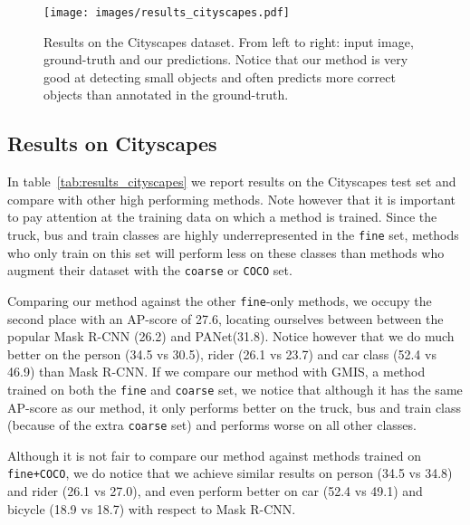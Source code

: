 \begin{figure*}
    \begin{center}
    	\texttt{[image: images/results\_cityscapes.pdf]}
    \end{center}
    \caption{Results on the Cityscapes dataset. From left to right: input image, ground-truth and our predictions. Notice that our method is very good at detecting small objects and often predicts more correct objects than annotated in the ground-truth.}
    \label{fig:results}
\end{figure*}

\subsection{Results on Cityscapes}
In table~\ref{tab:results_cityscapes} we report results on the Cityscapes test set and compare with other high performing methods. Note however that it is important to pay attention at the training data on which a method is trained. Since the truck, bus and train classes are highly underrepresented in the \texttt{fine} set, methods who only train on this set will perform less on these classes than methods who augment their dataset with the \texttt{coarse} or \texttt{COCO} set. 

Comparing our method against the other \texttt{fine}-only methods, we occupy the second place with an AP-score of 27.6, locating ourselves between between the popular Mask R-CNN (26.2) and PANet(31.8). Notice however that we do much better on the person (34.5 vs 30.5), rider (26.1 vs 23.7) and car class (52.4 vs 46.9) than Mask R-CNN. If we compare our method with GMIS, a method trained on both the \texttt{fine} and \texttt{coarse} set, we notice that although it has the same AP-score as our method, it only performs better on the truck, bus and train class (because of the extra \texttt{coarse} set) and performs worse on all other classes. 

Although it is not fair to compare our method against methods trained on \texttt{fine+COCO}, we do notice that we achieve similar results on person (34.5 vs 34.8) and rider (26.1 vs 27.0), and even perform better on car (52.4 vs 49.1) and bicycle (18.9 vs 18.7) with respect to Mask R-CNN.

